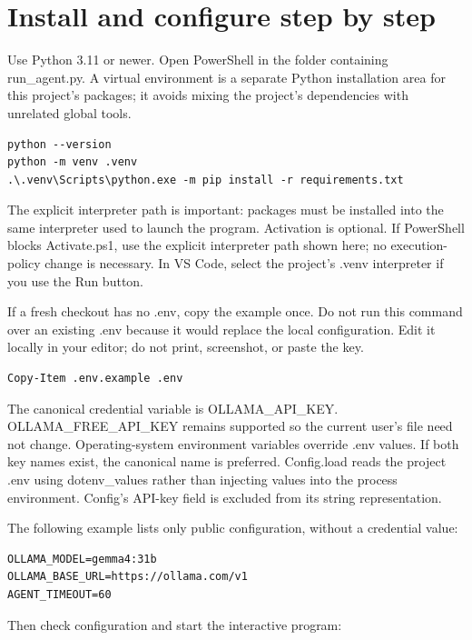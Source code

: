 \chapter{Install and configure step by step}

Use Python 3.11 or newer. Open PowerShell in the folder containing run\_agent.py. A virtual environment is a separate Python installation area for this project's packages; it avoids mixing the project's dependencies with unrelated global tools.

\begin{Verbatim}[breaklines,breakanywhere,fontsize=\small]
python --version
python -m venv .venv
.\.venv\Scripts\python.exe -m pip install -r requirements.txt
\end{Verbatim}

The explicit interpreter path is important: packages must be installed into the same interpreter used to launch the program. Activation is optional. If PowerShell blocks Activate.ps1, use the explicit interpreter path shown here; no execution-policy change is necessary. In VS Code, select the project's .venv interpreter if you use the Run button.

If a fresh checkout has no .env, copy the example once. Do not run this command over an existing .env because it would replace the local configuration. Edit it locally in your editor; do not print, screenshot, or paste the key.

\begin{Verbatim}[breaklines,breakanywhere,fontsize=\small]
Copy-Item .env.example .env
\end{Verbatim}

The canonical credential variable is OLLAMA\_API\_KEY. OLLAMA\_FREE\_API\_KEY remains supported so the current user's file need not change. Operating-system environment variables override .env values. If both key names exist, the canonical name is preferred. Config.load reads the project .env using dotenv\_values rather than injecting values into the process environment. Config's API-key field is excluded from its string representation.

The following example lists only public configuration, without a credential value:

\begin{Verbatim}[breaklines,breakanywhere,fontsize=\small]
OLLAMA_MODEL=gemma4:31b
OLLAMA_BASE_URL=https://ollama.com/v1
AGENT_TIMEOUT=60
\end{Verbatim}

Then check configuration and start the interactive program:


